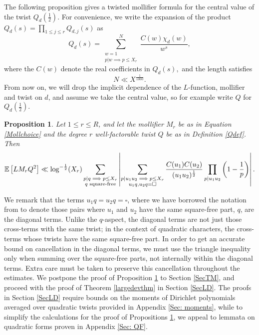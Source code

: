 \documentclass[12pt]{amsart}
\def\E{\ensuremath\mathbb{E}}
\numberwithin{equation}{section}
\newtheorem{prop}[thm]{Proposition}
\numberwithin{thm}{section}
\newcommand{\1}{\mathbf 1}
\begin{document}
The following proposition gives a twisted mollifier formula for the central value of the twist $Q_d(\frac{1}{2})$. For convenience, we write the expansion of the product $Q_d(s)=\prod_{1\le j \le r} Q_{d,j}(s)$ as \begin{equation}\label{defQd}
	Q_d(s)=\sum^N_{\substack{w=1\\p|w\implies p\le X_r}} \frac{C(w) \chi_d(w)}{w^s},
\end{equation}
where the $C(w)$ denote the real coefficients in $Q_d(s),$ and the length satisfies \begin{equation}
	N\ll X^{\frac{1}{1000}}.\end{equation}
From now on, we will drop the implicit dependence of the $L$-function, mollifier and twist  on $d$, and assume we take the central value, so for example write $Q$ for $Q_d	\left(\frac{1}{2}\right).$
\begin{prop}\label{twistmollprop}
	Let $1\le r \le R$, and let the mollifier $M_r$ be as in Equation \eqref{Mollchoice} and the degree $r$ well-factorable twist $Q$ be as in Definition \eqref{Qdef}. Then \begin{equation}\E\left[LM_rQ^2\right]\ll \log ^{-\frac{1}{2}}(X_r)\sum_{\substack{p|q\implies p\le X_r\\ q \text{ square-free}}}\left|\sum_{\substack{p|u_1u_2\implies p\le X_r\\ u_1q,u_2q=\square}}
		\frac{C(u_1)C(u_2)}{(u_1u_2)^{\frac{1}{2}}}\prod_{p|u_1u_2}\left(1-\frac{1}{p}\right)\right|.\end{equation}
\end{prop}




We remark that the terms $u_1q=u_2q=\square$, where we have borrowed the notation from \cite{RS2} to denote those pairs where $u_1$ and $u_2$ have the same square-free part, $q$, are the diagonal terms. 	Unlike the $q$-aspect, the diagonal terms are not just those cross-terms with the same twist; in the context of quadratic characters, the cross-terms whose twists have the same square-free part. In order to get an accurate bound on cancellation in the diagonal terms, we must use the triangle inequality only when summing over the square-free parts, not internally within the diagonal terms. Extra care must be taken to preserve this cancellation throughout the estimates. 
 We postpone the proof of Proposition \ref{twistmollprop} to Section \ref{SecTM}, and proceed with  the proof of Theorem \ref{largedevthm} in Section \ref{SecLD}. The proofs in Section \ref{SecLD} require bounds on the moments of Dirichlet polynomials averaged over quadratic twists provided in Appendix \ref{Sec: moments}, while to simplify the calculations for the proof of Propositions \ref{twistmollprop}, we appeal to lemmata on quadratic forms proven in Appendix \ref{Sec: QF}.
\end{document}
